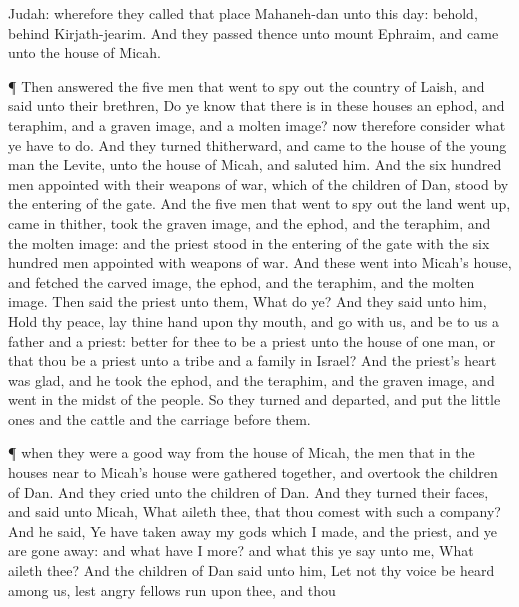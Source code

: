 {Judah: wherefore they
called that
place
Mahaneh-dan unto this
day: behold,
{}
behind
Kirjath-jearim.
And they
passed thence unto
mount
Ephraim, and
came unto the
house of
Micah.
\par }{\PP {}¶ Then
answered the
five
men that
went to spy
out the
country of
Laish, and
said unto their
brethren, Do ye
know that there
is in these
houses an
ephod, and
teraphim, and a graven
image, and a molten
image? now therefore
consider what ye have to
do.
And they
turned thitherward, and
came to the
house of the young
man the
Levite,
{} unto the
house of
Micah, and
saluted him.
And the
six
hundred
men
appointed with their
weapons of
war, which
{} of the
children of
Dan,
stood by the
entering of the
gate.
And the
five
men that
went to spy
out the
land went
up,
{} came
in thither,
{}
took the graven
image, and the
ephod, and the
teraphim, and the molten
image: and the
priest
stood in the
entering of the
gate with the
six
hundred
men
{}
appointed with
weapons of
war.
And these
went into
Micah’s
house, and
fetched the carved
image, the
ephod, and the
teraphim, and the molten
image. Then
said the
priest unto them, What
do ye?
And they
said unto him, Hold thy
peace,
lay thine
hand upon thy
mouth, and
go with us, and be to
us a
father and a
priest:
{}
better for thee to be a
priest unto the
house of
one
man, or that thou be a
priest unto a
tribe and a
family in
Israel?
And the
priest’s
heart was
glad, and he
took the
ephod, and the
teraphim, and the graven
image, and went
in the
midst of the
people.
So they
turned and
departed, and
put the little
ones and the
cattle and the
carriage
before them.
\par }{\PP {}¶
{} when they were a good
way from the
house of
Micah, the
men that
{} in the
houses near to
Micah’s
house were gathered
together, and
overtook the
children of
Dan.
And they
cried unto the
children of
Dan. And they
turned their
faces, and
said unto
Micah, What aileth thee, that thou comest with such a
company?
And he
said, Ye have taken
away my
gods which I
made, and the
priest, and ye are gone
away: and what have I more? and what
{} this
{} ye
say unto me, What aileth thee?
And the
children of
Dan
said unto him, Let not thy
voice be
heard among us, lest
angry
fellows
run upon thee, and thou
}

